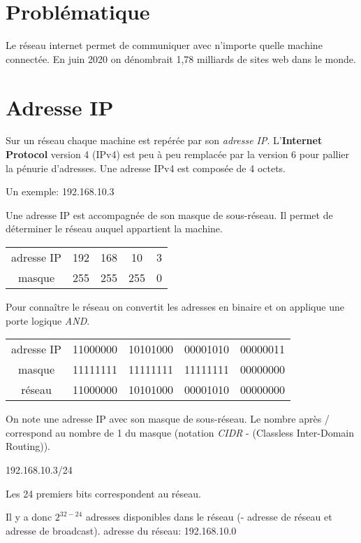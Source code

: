 \documentclass[a4paper,11pt]{article}
\begin{document}
\section{Problématique}
Le réseau internet permet de communiquer avec n'importe quelle machine connectée. En juin 2020 on dénombrait 1,78 milliards de sites web dans le monde.
\begin{center}
\end{center}
\section{Adresse IP}
Sur un réseau chaque machine est repérée par son \emph{adresse IP}. L'\textbf{Internet Protocol} version 4 (IPv4) est peu à peu remplacée par la version 6 pour pallier la pénurie d'adresses. Une adresse IPv4 est composée de 4 octets.
\begin{center}
    Un exemple: \large{192.168.10.3}
\end{center}
Une adresse IP est accompagnée de son masque de sous-réseau. Il permet de déterminer le réseau auquel appartient la machine.
\begin{center}
    \begin{tabular}{ccccc}
        adresse IP & 192 & 168 & 10  & 3 \\
        masque     & 255 & 255 & 255 & 0 \\
    \end{tabular}
\end{center}
Pour connaître le réseau on convertit les adresses en binaire et on applique une porte logique \emph{AND}.
\begin{center}
    \begin{tabular}{ccccc}
        adresse IP & 11000000 & 10101000 & 00001010 & 00000011 \\
        masque     & 11111111 & 11111111 & 11111111 & 00000000 \\
        réseau     & 11000000 & 10101000 & 00001010 & 00000000 \\
    \end{tabular}
\end{center}

\begin{aretenir}[]
    On note une adresse IP avec son masque de sous-réseau. Le nombre après / correspond au nombre de 1 du masque (notation \emph{CIDR} - (Classless Inter-Domain Routing)).
    \begin{center}
        192.168.10.3/24
    \end{center}
    Les 24 premiers bits correspondent au réseau.
    \begin{commentprof}
        Il y a donc $2^{32-24}$ adresses disponibles dans le réseau (- adresse de réseau et adresse de broadcast). adresse du réseau: 192.168.10.0
    \end{commentprof}
\end{aretenir}
\end{document}
